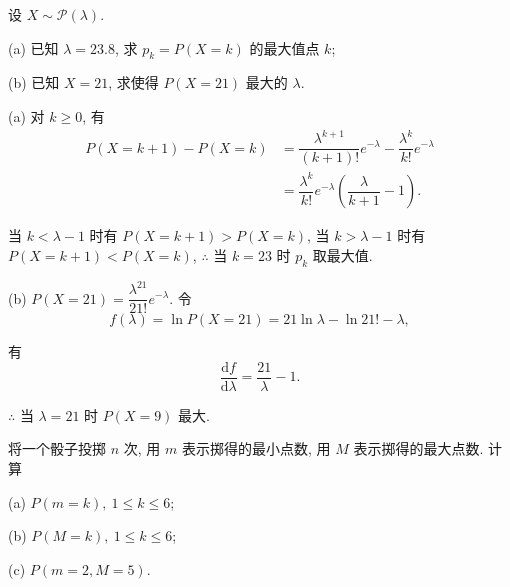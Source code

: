 \documentclass[color=black,device=normal,lang=cn]{elegantnote}
\numberwithin{equation}{section}
\theoremstyle{plain}
\numberwithin{exercise}{exsection}
\begin{document}
\begin{exercise}%
    设 $X\sim\mathcal{P}(\lambda)$.

    (a) 已知 $\lambda=23.8$, 求 $p_k=P(X=k)$ 的最大值点 $k$;

    (b) 已知 $X=21$, 求使得 $P(X=21)$ 最大的 $\lambda$.
\end{exercise}
\begin{solution}
    (a) 对 $k\geq0$, 有
    \begin{align*}
        P(X=k+1)-P(X=k) & =\dfrac{\lambda^{k+1}}{(k+1)!}e^{-\lambda}-\dfrac{\lambda^k}{k!}e^{-\lambda} \\
        & =\dfrac{\lambda^k}{k!}e^{-\lambda}\left(\dfrac{\lambda}{k+1}-1\right).
    \end{align*}

    当 $k<\lambda-1$ 时有 $P(X=k+1)>P(X=k)$, 当 $k>\lambda-1$ 时有 $P(X=k+1)<P(X=k)$, $\therefore$ 当 $k=23$ 时 $p_k$ 取最大值.

    (b) $P(X=21)=\dfrac{\lambda^{21}}{21!}e^{-\lambda}$. 令
    \[f(\lambda)=\ln P(X=21)=21\ln\lambda-\ln21!-\lambda,\]

    有
    \[\dfrac{\mathrm{d}f}{\mathrm{d}\lambda}=\dfrac{21}{\lambda}-1.\]

    $\therefore$ 当 $\lambda=21$ 时 $P(X=9)$ 最大.
\end{solution}
\begin{exercise}%
    将一个骰子投掷 $n$ 次, 用 $m$ 表示掷得的最小点数, 用 $M$ 表示掷得的最大点数. 计算

    (a) $P(m=k),\ 1\leq k\leq6$;

    (b) $P(M=k),\ 1\leq k\leq6$;

    (c) $P(m=2,M=5)$.
\end{exercise}
\end{document}
